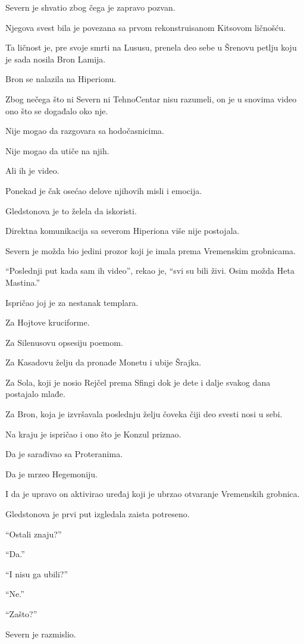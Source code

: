 Severn je shvatio zbog čega je zapravo pozvan.

Njegova svest bila je povezana sa prvom rekonstruisanom Kitsovom ličnošću.

Ta ličnost je, pre svoje smrti na Lususu, prenela deo sebe u Šrenovu petlju koju je sada nosila Bron Lamija.

Bron se nalazila na Hiperionu.

Zbog nečega što ni Severn ni TehnoCentar nisu razumeli, on je u snovima video ono što se događalo oko nje.

Nije mogao da razgovara sa hodočasnicima.

Nije mogao da utiče na njih.

Ali ih je video.

Ponekad je čak osećao delove njihovih misli i emocija.

Gledstonova je to želela da iskoristi.

Direktna komunikacija sa severom Hiperiona više nije postojala.

Severn je možda bio jedini prozor koji je imala prema Vremenskim grobnicama.

``Poslednji put kada sam ih video'', rekao je, ``svi su bili živi. Osim možda Heta Mastina.''

Ispričao joj je za nestanak templara.

Za Hojtove kruciforme.

Za Silenusovu opsesiju poemom.

Za Kasadovu želju da pronađe Monetu i ubije Šrajka.

Za Sola, koji je nosio Rejčel prema Sfingi dok je dete i dalje svakog dana postajalo mlađe.

Za Bron, koja je izvršavala poslednju želju čoveka čiji deo svesti nosi u sebi.

Na kraju je ispričao i ono što je Konzul priznao.

Da je sarađivao sa Proteranima.

Da je mrzeo Hegemoniju.

I da je upravo on aktivirao uređaj koji je ubrzao otvaranje Vremenskih grobnica.

Gledstonova je prvi put izgledala zaista potreseno.

``Ostali znaju?''

``Da.''

``I nisu ga ubili?''

``Ne.''

``Zašto?''

Severn je razmislio.

